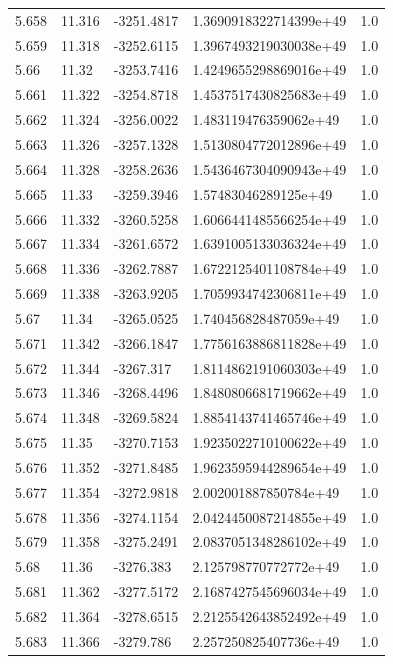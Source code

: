 \begin{tabular}{lllll}
5.658 & 11.316 & -3251.4817 & 1.3690918322714399e+49 & 1.0 \\
5.659 & 11.318 & -3252.6115 & 1.3967493219030038e+49 & 1.0 \\
5.66 & 11.32 & -3253.7416 & 1.4249655298869016e+49 & 1.0 \\
5.661 & 11.322 & -3254.8718 & 1.4537517430825683e+49 & 1.0 \\
5.662 & 11.324 & -3256.0022 & 1.483119476359062e+49 & 1.0 \\
5.663 & 11.326 & -3257.1328 & 1.5130804772012896e+49 & 1.0 \\
5.664 & 11.328 & -3258.2636 & 1.5436467304090943e+49 & 1.0 \\
5.665 & 11.33 & -3259.3946 & 1.57483046289125e+49 & 1.0 \\
5.666 & 11.332 & -3260.5258 & 1.6066441485566254e+49 & 1.0 \\
5.667 & 11.334 & -3261.6572 & 1.6391005133036324e+49 & 1.0 \\
5.668 & 11.336 & -3262.7887 & 1.6722125401108784e+49 & 1.0 \\
5.669 & 11.338 & -3263.9205 & 1.7059934742306811e+49 & 1.0 \\
5.67 & 11.34 & -3265.0525 & 1.740456828487059e+49 & 1.0 \\
5.671 & 11.342 & -3266.1847 & 1.7756163886811828e+49 & 1.0 \\
5.672 & 11.344 & -3267.317 & 1.8114862191060303e+49 & 1.0 \\
5.673 & 11.346 & -3268.4496 & 1.8480806681719662e+49 & 1.0 \\
5.674 & 11.348 & -3269.5824 & 1.8854143741465746e+49 & 1.0 \\
5.675 & 11.35 & -3270.7153 & 1.9235022710100622e+49 & 1.0 \\
5.676 & 11.352 & -3271.8485 & 1.9623595944289654e+49 & 1.0 \\
5.677 & 11.354 & -3272.9818 & 2.002001887850784e+49 & 1.0 \\
5.678 & 11.356 & -3274.1154 & 2.0424450087214855e+49 & 1.0 \\
5.679 & 11.358 & -3275.2491 & 2.0837051348286102e+49 & 1.0 \\
5.68 & 11.36 & -3276.383 & 2.125798770772772e+49 & 1.0 \\
5.681 & 11.362 & -3277.5172 & 2.1687427545696034e+49 & 1.0 \\
5.682 & 11.364 & -3278.6515 & 2.2125542643852492e+49 & 1.0 \\
5.683 & 11.366 & -3279.786 & 2.257250825407736e+49 & 1.0 \\

\end{tabular}
